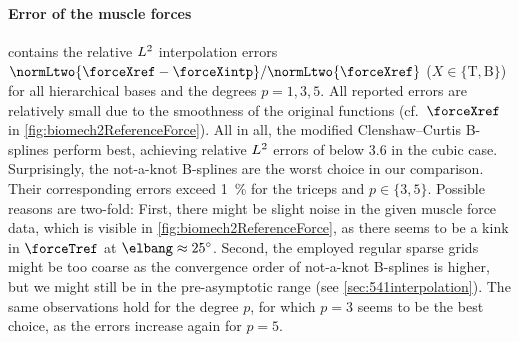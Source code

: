 \paragraph{Error of the muscle forces}

 contains the relative $L^2$
interpolation errors
$\normLtwo{\forceXref - \forceXintp}/\normLtwo{\forceXref}$
($X \in \{\mathrm{T}, \mathrm{B}\}$)
for all hierarchical bases and the degrees $p = 1, 3, 5$.
All reported errors are relatively small
due to the smoothness of the original functions
(cf.\ $\forceXref$ in \cref{fig:biomech2ReferenceForce}).
All in all, the modified Clenshaw--Curtis B-splines perform best,
achieving relative $L^2$ errors of below \SI{3.6}{\permille}
in the cubic case.
Surprisingly, the not-a-knot B-splines are the worst choice in our
comparison.
Their corresponding errors exceed \SI{1}{\percent} for the triceps
and $p \in \{3, 5\}$.
Possible reasons are two-fold:
First, there might be slight noise in the given muscle force data,
which is visible in \cref{fig:biomech2ReferenceForce},
as there seems to be a kink in $\forceTref$ at $\elbang \approx \ang{25}$.
Second, the employed regular sparse grids might be too coarse
as the convergence order of not-a-knot B-splines is higher,
but we might still be in the pre-asymptotic range
(see \cref{sec:541interpolation}).
The same observations hold for the degree $p$,
for which $p = 3$ seems to be the best choice,
as the errors increase again for $p = 5$.

